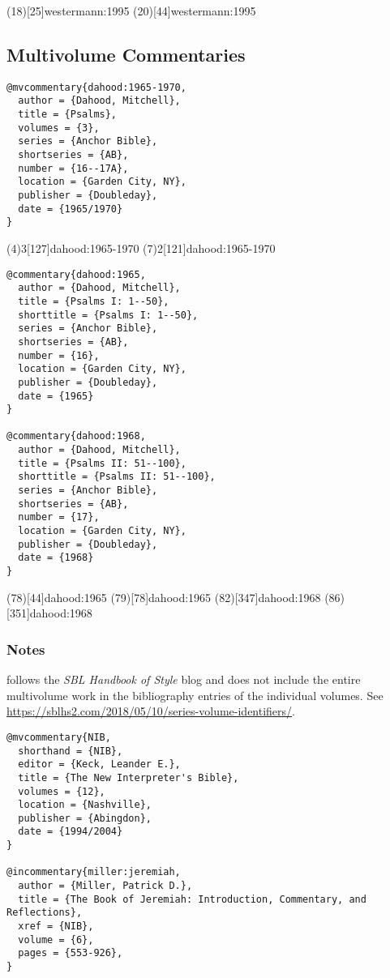 \documentclass[a4paper]{article}
\begin{document}
\examplecite(18)[25]{westermann:1995}
\examplecite(20)[44]{westermann:1995}
\exampleabbreviations
\examplebibliography

\subsection{Multivolume Commentaries}

\begin{verbatim}
@mvcommentary{dahood:1965-1970,
  author = {Dahood, Mitchell},
  title = {Psalms},
  volumes = {3},
  series = {Anchor Bible},
  shortseries = {AB},
  number = {16--17A},
  location = {Garden City, NY},
  publisher = {Doubleday},
  date = {1965/1970}
}
\end{verbatim}

\examplevolcite(4){3}[127]{dahood:1965-1970}
\examplevolcite(7){2}[121]{dahood:1965-1970}
\exampleabbreviations
\examplebibliography

\newrefsection

\begin{verbatim}
@commentary{dahood:1965,
  author = {Dahood, Mitchell},
  title = {Psalms I: 1--50},
  shorttitle = {Psalms I: 1--50},
  series = {Anchor Bible},
  shortseries = {AB},
  number = {16},
  location = {Garden City, NY},
  publisher = {Doubleday},
  date = {1965}
}

@commentary{dahood:1968,
  author = {Dahood, Mitchell},
  title = {Psalms II: 51--100},
  shorttitle = {Psalms II: 51--100},
  series = {Anchor Bible},
  shortseries = {AB},
  number = {17},
  location = {Garden City, NY},
  publisher = {Doubleday},
  date = {1968}
}
\end{verbatim}

\examplecite(78)[44]{dahood:1965}
\examplecite(79)[78]{dahood:1965}
\examplecite(82)[347]{dahood:1968}
\examplecite(86)[351]{dahood:1968}
\exampleabbreviations
\examplebibliography

\subsubsection{Notes}

 follows the \emph{SBL Handbook of Style} blog and does
not include the entire multivolume work in the bibliography entries of the
individual volumes. See
\url{https://sblhs2.com/2018/05/10/series-volume-identifiers/}.

\newrefsection

\begin{verbatim}
@mvcommentary{NIB,
  shorthand = {NIB},
  editor = {Keck, Leander E.},
  title = {The New Interpreter's Bible},
  volumes = {12},
  location = {Nashville},
  publisher = {Abingdon},
  date = {1994/2004}
}

@incommentary{miller:jeremiah,
  author = {Miller, Patrick D.},
  title = {The Book of Jeremiah: Introduction, Commentary, and Reflections},
  xref = {NIB},
  volume = {6},
  pages = {553-926},
}
\end{verbatim}
\end{document}

